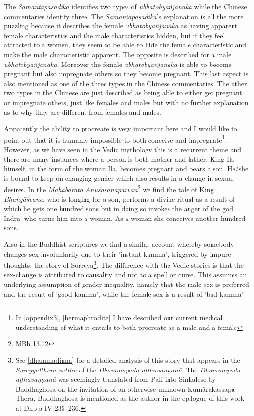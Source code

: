 The {\em Samantapāsādikā} identifies two types of {\em ubhatob­yañ­janaka} while the Chinese commentaries identify three. The {\em Samantapāsādikā}'s explanation is all the more puzzling because it describes the female {\em ubhatob­yañ­janaka} as having apparent female characteristics and the male characteristics hidden, but if they feel attracted to a women, they seem to be able to hide the female characteristic and make the male characteristic apparent. The opposite is described for a male {\em ubhatob­yañ­janaka}. Moreover the female {\em ubhatob­yañ­janaka} is able to become pregnant but also impregnate others so they become pregnant. This last aspect is also mentioned as one of the three types in the Chinese commentaries. The other two types in the Chinese are just described as being able to either get pregnant or impregnate others, just like females and males but with no further explanation as to why they are different from females and males. 

Apparently the ability to procreate is very important here and I would like to point out that it is humanly impossible to both conceive and impregnate\footnote{In \ref{appendix3}, \ref{hermaphrodite} I have described our current medical understanding of what it entails to both procreate as a male and a female}. However, as we have seen in the Vedic mythology this is a recurrent theme and there are many instances where a person is both mother and father. King Ila himself, in the form of the woman Ilā, becomes pregnant and bears a son. He/she is bound to keep on changing gender which also results in a change in sexual desires. In the {\em Mahābārata Anuśāsanaparvan}\footnote{MBh 13.12} we find the tale of King {\em Bhaṅgāśvana}, who is longing for a son, performs a divine ritual as a result of which he gets one hundred sons but in doing so invokes the anger of the god Indra, who turns him into a woman. As a woman she conceives another hundred sons. 

Also in the Buddhist scriptures we find a similar account whereby somebody changes sex involuntarily due to their 'instant kamma', triggered by impure thoughts; the story of Sorreya\footnote{See \ref{dhammadinna} for a detailed analysis of this story that appears in the {\em Soreyyatthera-vatthu} of the {\em Dhammapada-aṭṭhavaṇṇanā}. The {\em Dhammapada-aṭṭhavaṇṇanā} was seemingly translated from Pali into Sinhalese by Buddhaghosa on the invitation of an otherwise unknown Kumārakassapa Thera. Buddhaghosa is mentioned as the author in the epilogue of this work at Dhp-a IV 235–236.}. The difference with the Vedic stories is that the sex-change is attributed to causality and not to a spell or curse. This assumes an underlying assumption of gender inequality, namely that the male sex is preferred and the result of 'good kamma', while the female sex is a result of 'bad kamma'

